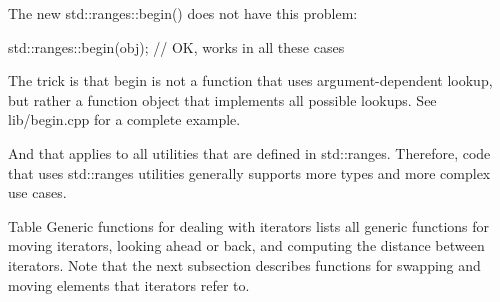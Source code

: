 The new std::ranges::begin() does not have this problem:

\begin{cpp}
std::ranges::begin(obj); // OK, works in all these cases
\end{cpp}

The trick is that begin is not a function that uses argument-dependent lookup, but rather a function object that implements all possible lookups. See lib/begin.cpp for a complete example.

And that applies to all utilities that are defined in std::ranges. Therefore, code that uses std::ranges utilities generally supports more types and more complex use cases.


Table Generic functions for dealing with iterators lists all generic functions for moving iterators, looking ahead or back, and computing the distance between iterators. Note that the next subsection describes functions for swapping and moving elements that iterators refer to.

